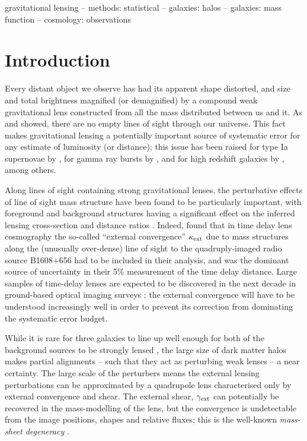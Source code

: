 \documentclass[useAMS,usenatbib,a4paper]{mn2e}
\begin{document}
\begin{keywords}
  gravitational lensing   --
  methods: statistical    --
  galaxies: halos         --
  galaxies: mass function  --
  cosmology: observations
\end{keywords}

\setcounter{footnote}{1}


\section{Introduction}
\label{sec:intro}

Every distant object we observe has had its apparent shape distorted,
and size and total brightness magnified (or demagnified) by a compound
weak gravitational lens constructed from all the mass distributed
between us and it. As \citet{Vale+White2003} and \citet{HilbertEtal2007}
showed, there are no empty lines of sight through our universe. This
fact makes gravitational lensing a potentially important source of
systematic error for any estimate of luminosity (or distance); this 
issue has been 
raised for \eg type Ia supernovae by
\citet[][]{Holz+Wald1998,Holz+Linder2005}, for gamma ray bursts by
\citet[][]{Oguri+Takahashi2006,Wang+Dai2011},  and for high redshift
galaxies by \citet{WyitheEtal2011}, among others. 

Along lines of sight containing strong gravitational lenses, the perturbative
effects of line of sight mass structure have been found to be particularly
important, with foreground and background structures having a significant
effect on the inferred lensing cross-section \citep[\eg][]{WongEtal2012} and
distance ratios \citep[][]{DalalEtal2005}. Indeed, \citet{SuyuEtal2010} found
that in time delay lens cosmography the so-called ``external convergence''
$\kappa_{\rm ext}$ due to mass structures along the (unusually over-dense) line of
sight to the quadruply-imaged radio source B1608$+$656 had to be included in
their analysis, and was the dominant source of uncertainty in their 5\%
measurement of the time  delay distance.  Large samples of time-delay lenses
are expected to be discovered in the next decade in ground-based optical
imaging surveys \citep{Oguri+Marshall2010};  the external convergence will
have to be understood increasingly well in order to prevent its correction
from dominating the systematic error budget.

While it is rare for three galaxies to line up well enough for both of
the background sources to be strongly lensed \citep{GavazziEtal2008,CollettEtal2012a}, 
the large size of dark matter halos makes partial alignments -- such that they
act as perturbing weak lenses --  a near certainty. The large scale of the
perturbers means the external lensing perturbations can be approximated
by a quadrupole lens characterised only by external convergence and shear.
The external shear, $\gamma_{\rm ext}$ can potentially be recovered in the
mass-modelling of the lens, but the convergence is undetectable from the
image positions, shapes and relative fluxes; this is the well-known {\emph{ 
mass-sheet degeneracy}} \citep[see e.g.][for details]{FalcoEtal1985}.
\end{document}
